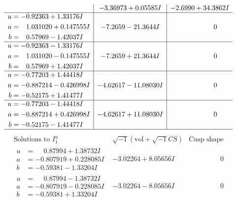 \documentclass[1p]{elsarticle_modified}
\theoremstyle{definition}
\newcommand{\I}{\sqrt{-1}}
\begin{document}
$$\begin{array}{c|c|c}
 & -3.36973 + 0.05585 I & -2.6990 + 34.3862 I \\ \hline\begin{aligned}
u &= -0.92363 + 1.33176 I \\
a &= \phantom{-}1.031020 + 0.147555 I \\
b &= \phantom{-}0.57969 - 1.42037 I\end{aligned}
 & -7.2659 - 21.3644 I & \phantom{-0.000000 } 0 \\ \hline\begin{aligned}
u &= -0.92363 - 1.33176 I \\
a &= \phantom{-}1.031020 - 0.147555 I \\
b &= \phantom{-}0.57969 + 1.42037 I\end{aligned}
 & -7.2659 + 21.3644 I & \phantom{-0.000000 } 0 \\ \hline\begin{aligned}
u &= -0.77203 + 1.44418 I \\
a &= -0.887214 - 0.426998 I \\
b &= -0.52175 + 1.41477 I\end{aligned}
 & -4.62617 - 11.08030 I & \phantom{-0.000000 } 0 \\ \hline\begin{aligned}
u &= -0.77203 - 1.44418 I \\
a &= -0.887214 + 0.426998 I \\
b &= -0.52175 - 1.41477 I\end{aligned}
 & -4.62617 + 11.08030 I & \phantom{-0.000000 } 0\\
 \hline 
 \end{array}$$\newpage$$\begin{array}{c|c|c}  
\text{Solutions to }I^u_{1}& \I (\text{vol} + \sqrt{-1}CS) & \text{Cusp shape}\\
 \hline 
\begin{aligned}
u &= \phantom{-}0.87994 + 1.38732 I \\
a &= -0.807919 + 0.228085 I \\
b &= -0.59381 - 1.33204 I\end{aligned}
 & -3.02264 + 8.05656 I & \phantom{-0.000000 } 0 \\ \hline\begin{aligned}
u &= \phantom{-}0.87994 - 1.38732 I \\
a &= -0.807919 - 0.228085 I \\
b &= -0.59381 + 1.33204 I\end{aligned}
 & -3.02264 - 8.05656 I & \phantom{-0.000000 } 0 \\ \hline\begin{aligned}

\end{aligned}
\end{array}$$
\end{document}
